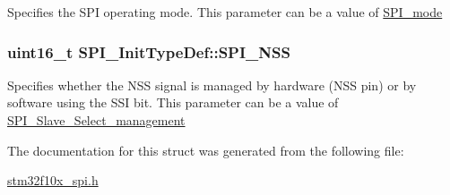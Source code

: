 \label{structSPI__InitTypeDef_a578435d3b3a17baa5d5ff87447aa697f}
Specifies the SPI operating mode. This parameter can be a value of \hyperlink{group__SPI__mode}{SPI\_\-mode} \hypertarget{structSPI__InitTypeDef_a6c1ea4b5e3d147b74799efa42e3903c6}{
\subsubsection[{SPI\_\-NSS}]{\setlength{\rightskip}{0pt plus 5cm}uint16\_\-t {\bf SPI\_\-InitTypeDef::SPI\_\-NSS}}}
\label{structSPI__InitTypeDef_a6c1ea4b5e3d147b74799efa42e3903c6}
Specifies whether the NSS signal is managed by hardware (NSS pin) or by software using the SSI bit. This parameter can be a value of \hyperlink{group__SPI__Slave__Select__management}{SPI\_\-Slave\_\-Select\_\-management} 

The documentation for this struct was generated from the following file:\begin{DoxyCompactItemize}
\item 
\hyperlink{stm32f10x__spi_8h}{stm32f10x\_\-spi.h}\end{DoxyCompactItemize}

